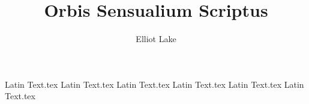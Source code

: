 \documentclass[11pt]{book}
\author{Elliot Lake}
\title{Orbis Sensualium Scriptus}
\begin{document}
\maketitle 
\tableofcontents

{Latin Text.tex}
{Latin Text.tex}
{Latin Text.tex}
{Latin Text.tex}
{Latin Text.tex}
{Latin Text.tex}
\end{document}

